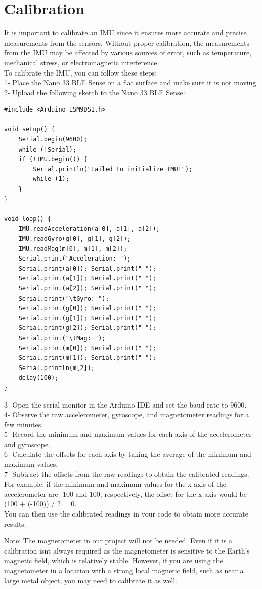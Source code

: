 \section{Calibration}
It is important to calibrate an IMU since it ensures more accurate and precise measurements from the sensors. Without proper calibration, the measurements from the IMU may be affected by various sources of error, such as temperature, mechanical stress, or electromagnetic interference.\\
To calibrate the IMU, you can follow these steps:\\
1- Place the Nano 33 BLE Sense on a flat surface and make sure it is not moving.\\
2- Upload the following sketch to the Nano 33 BLE Sense:\\
\begin{verbatim}
#include <Arduino_LSM9DS1.h>

void setup() {
	Serial.begin(9600);
	while (!Serial);
	if (!IMU.begin()) {
		Serial.println("Failed to initialize IMU!");
		while (1);
	}
}

void loop() {
	IMU.readAcceleration(a[0], a[1], a[2]);
	IMU.readGyro(g[0], g[1], g[2]);
	IMU.readMag(m[0], m[1], m[2]);
	Serial.print("Acceleration: ");
	Serial.print(a[0]); Serial.print(" ");
	Serial.print(a[1]); Serial.print(" ");
	Serial.print(a[2]); Serial.print(" ");
	Serial.print("\tGyro: ");
	Serial.print(g[0]); Serial.print(" ");
	Serial.print(g[1]); Serial.print(" ");
	Serial.print(g[2]); Serial.print(" ");
	Serial.print("\tMag: ");
	Serial.print(m[0]); Serial.print(" ");
	Serial.print(m[1]); Serial.print(" ");
	Serial.println(m[2]);
	delay(100);
}

\end{verbatim}
3- Open the serial monitor in the Arduino IDE and set the baud rate to 9600.\\
4- Observe the raw accelerometer, gyroscope, and magnetometer readings for a few minutes.\\
5- Record the minimum and maximum values for each axis of the accelerometer and gyroscope.\\
6- Calculate the offsets for each axis by taking the average of the minimum and maximum values.\\
7- Subtract the offsets from the raw readings to obtain the calibrated readings.\\

For example, if the minimum and maximum values for the x-axis of the accelerometer are -100 and 100, respectively, the offset for the x-axis would be (100 + (-100)) / 2 = 0.\\

You can then use the calibrated readings in your code to obtain more accurate results.

Note: The magnetometer in our project will not be needed.
Even if it is a calibration isnt always required as the magnetometer is sensitive to the Earth's magnetic field, which is relatively stable. However, if you are using the magnetometer in a location with a strong local magnetic field, such as near a large metal object, you may need to calibrate it as well.




